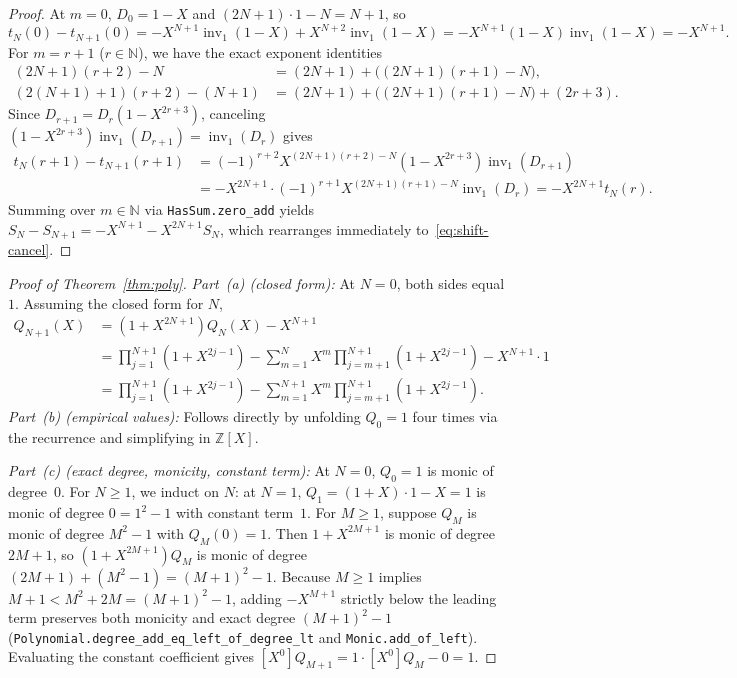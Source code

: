 \documentclass[11pt]{article}
\theoremstyle{definition}
\newcommand{\N}{\mathbb{N}}
\newcommand{\Z}{\mathbb{Z}}
\newcommand{\inv}{\operatorname{inv}_1}
\begin{document}
\begin{proof}
At $m = 0$, $D_0 = 1 - X$ and $(2N + 1) \cdot 1 - N = N + 1$, so
\[
t_N(0) - t_{N+1}(0)
= -X^{N+1} \inv(1 - X) + X^{N+2} \inv(1 - X)
= -X^{N+1} (1 - X) \inv(1 - X) = -X^{N+1}.
\]
For $m = r + 1$ ($r \in \N$), we have the exact exponent identities
\begin{align*}
(2N + 1)(r + 2) - N &= (2N + 1) + \bigl((2N + 1)(r + 1) - N\bigr), \\
(2(N + 1) + 1)(r + 2) - (N + 1) &= (2N + 1) + \bigl((2N + 1)(r + 1) - N\bigr) + (2r + 3).
\end{align*}
Since $D_{r+1} = D_r (1 - X^{2r+3})$, canceling $(1 - X^{2r+3}) \inv(D_{r+1}) = \inv(D_r)$ gives
\begin{align*}
t_N(r + 1) - t_{N+1}(r + 1)
&= (-1)^{r+2} X^{(2N+1)(r+2) - N} (1 - X^{2r+3}) \inv(D_{r+1}) \\
&= -X^{2N+1} \cdot (-1)^{r+1} X^{(2N+1)(r+1) - N} \inv(D_r)
= -X^{2N+1} t_N(r).
\end{align*}
Summing over $m \in \N$ via \texttt{HasSum.zero\_add} yields $S_N - S_{N+1} = -X^{N+1} - X^{2N+1} S_N$, which rearranges immediately to~\eqref{eq:shift-cancel}.
\end{proof}

\begin{proof}[Proof of Theorem~\ref{thm:poly}]
\emph{Part~(a) (closed form):} At $N = 0$, both sides equal~$1$. Assuming the closed form for $N$,
\begin{align*}
Q_{N+1}(X)
&= (1 + X^{2N+1}) Q_N(X) - X^{N+1} \\
&= \prod_{j=1}^{N+1} (1 + X^{2j-1}) - \sum_{m=1}^{N} X^m \prod_{j=m+1}^{N+1} (1 + X^{2j-1}) - X^{N+1} \cdot 1 \\
&= \prod_{j=1}^{N+1} (1 + X^{2j-1}) - \sum_{m=1}^{N+1} X^m \prod_{j=m+1}^{N+1} (1 + X^{2j-1}).
\end{align*}
\emph{Part~(b) (empirical values):} Follows directly by unfolding $Q_0 = 1$ four times via the recurrence and simplifying in $\Z[X]$.

\emph{Part~(c) (exact degree, monicity, constant term):} At $N = 0$, $Q_0 = 1$ is monic of degree~$0$. For $N \ge 1$, we induct on $N$: at $N = 1$, $Q_1 = (1 + X)\cdot 1 - X = 1$ is monic of degree $0 = 1^2 - 1$ with constant term~$1$. For $M \ge 1$, suppose $Q_M$ is monic of degree $M^2 - 1$ with $Q_M(0) = 1$. Then $1 + X^{2M+1}$ is monic of degree $2M + 1$, so $(1 + X^{2M+1}) Q_M$ is monic of degree $(2M + 1) + (M^2 - 1) = (M + 1)^2 - 1$. Because $M \ge 1$ implies $M + 1 < M^2 + 2M = (M + 1)^2 - 1$, adding $-X^{M+1}$ strictly below the leading term preserves both monicity and exact degree $(M + 1)^2 - 1$ (\texttt{Polynomial.degree\_add\_eq\_left\_of\_degree\_lt} and \texttt{Monic.add\_of\_left}). Evaluating the constant coefficient gives $[X^0] Q_{M+1} = 1 \cdot [X^0] Q_M - 0 = 1$.
\end{proof}
\end{document}
